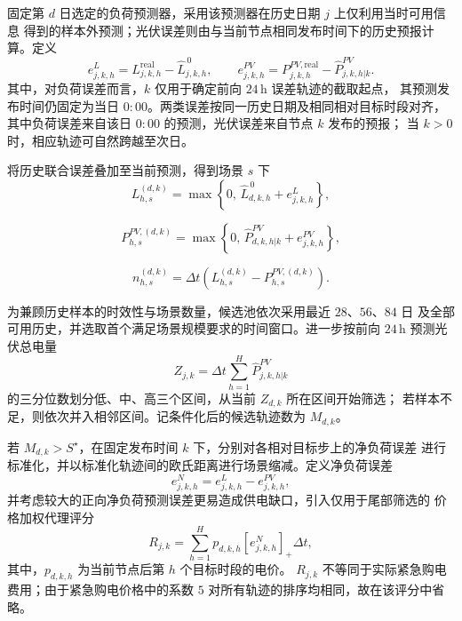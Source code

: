 \documentclass[zihao=-4,a4paper,UTF8,fontset=none]{ctexart}
\begin{document}
固定第 $d$ 日选定的负荷预测器，采用该预测器在历史日期 $j$ 上仅利用当时可用信息
得到的样本外预测；光伏误差则由与当前节点相同发布时间下的历史预报计算。定义
\begin{equation}
e_{j,k,h}^{L}
=
L_{j,k,h}^{\mathrm{real}}
-
\widehat{L}_{j,k,h}^{\,0},
\qquad
e_{j,k,h}^{PV}
=
P_{j,k,h}^{PV,\mathrm{real}}
-
\widehat{P}_{j,k,h|k}^{PV}.
\label{eq:q3_joint_error}
\end{equation}
其中，对负荷误差而言，$k$ 仅用于确定前向 $24\,\mathrm{h}$ 误差轨迹的截取起点，
其预测发布时间仍固定为当日 $0{:}00$。两类误差按同一历史日期及相同相对目标时段对齐，
其中负荷误差来自该日 $0{:}00$ 的预测，光伏误差来自节点 $k$ 发布的预报；
当 $k>0$ 时，相应轨迹可自然跨越至次日。

将历史联合误差叠加至当前预测，得到场景 $s$ 下
\begin{equation}
L_{h,s}^{(d,k)}
=
\max\left\{
0,\,
\widehat{L}_{d,k,h}^{\,0}
+
e_{j,k,h}^{L}
\right\},
\label{eq:q3_scenario_load}
\end{equation}

\begin{equation}
P_{h,s}^{PV,(d,k)}
=
\max\left\{
0,\,
\widehat{P}_{d,k,h|k}^{PV}
+
e_{j,k,h}^{PV}
\right\},
\label{eq:q3_scenario_pv}
\end{equation}

\begin{equation}
n_{h,s}^{(d,k)}
=
\Delta t
\left(
L_{h,s}^{(d,k)}
-
P_{h,s}^{PV,(d,k)}
\right).
\label{eq:q3_scenario_netload}
\end{equation}

为兼顾历史样本的时效性与场景数量，候选池依次采用最近 $28$、$56$、$84$ 日
及全部可用历史，并选取首个满足场景规模要求的时间窗口。进一步按前向
$24\,\mathrm{h}$ 预测光伏总电量
\begin{equation}
Z_{j,k}
=
\Delta t
\sum_{h=1}^{H}
\widehat{P}_{j,k,h|k}^{PV}
\label{eq:q3_pv_energy_indicator}
\end{equation}
的三分位数划分低、中、高三个区间，从当前 $Z_{d,k}$ 所在区间开始筛选；
若样本不足，则依次并入相邻区间。记条件化后的候选轨迹数为 $M_{d,k}$。

若 $M_{d,k}>S^\star$，在固定发布时间 $k$ 下，分别对各相对目标步上的净负荷误差
进行标准化，并以标准化轨迹间的欧氏距离进行场景缩减。定义净负荷误差
\begin{equation}
e_{j,k,h}^{N}
=
e_{j,k,h}^{L}
-
e_{j,k,h}^{PV},
\label{eq:q3_netload_error}
\end{equation}
并考虑较大的正向净负荷预测误差更易造成供电缺口，引入仅用于尾部筛选的
价格加权代理评分
\begin{equation}
R_{j,k}
=
\sum_{h=1}^{H}
p_{d,k,h}
\left[e_{j,k,h}^{N}\right]_+
\Delta t,
\label{eq:q3_tail_score}
\end{equation}
其中，$p_{d,k,h}$ 为当前节点后第 $h$ 个目标时段的电价。
$R_{j,k}$ 不等同于实际紧急购电费用；由于紧急购电价格中的系数 $5$
对所有轨迹的排序均相同，故在该评分中省略。
\end{document}
